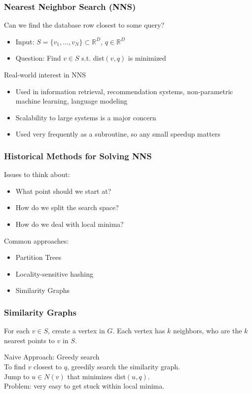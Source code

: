 \begin{frame}[t]
	\frametitle{Nearest Neighbor Search (NNS)}
		Can we find the database row closest to some query?
		\onslide<2-3> {
			\begin{itemize}
				\item Input: $S = \{v_1, \dots, v_N\} \subset \mathbb{R}^D$, $q \in \mathbb{R}^D$
				\item Question: Find $v \in S$ s.t. dist$(v, q)$ is minimized
			\end{itemize}
		}
		\vspace{5.0em}
		Real-world interest in NNS
		\onslide<3> {
			\begin{itemize}
				\item Used in information retrieval, recommendation systems, non-parametric machine learning, language modeling
				\item Scalability to large systems is a major concern
				\item Used very frequently as a subroutine, so any small speedup matters
			\end{itemize}
		}
\end{frame}

\begin{frame}[t]
	\frametitle{Historical Methods for Solving NNS}
	Issues to think about:
		\onslide<2-3> {
			\begin{itemize}
				\item What point should we start at?
				\item How do we split the search space?
				\item How do we deal with local minima?
			\end{itemize}
		}
		\vspace{5.0em}
		Common approaches:
		\onslide<3> {
			\begin{itemize}
				\item Partition Trees
				\item Locality-sensitive hashing
				\item Similarity Graphs
			\end{itemize}
		}
\end{frame}

\begin{frame}[t]
	\frametitle{Similarity Graphs}
	For each $v \in S$, create a vertex in $G$.
	Each vertex has $k$ neighbors, who are the $k$ nearest points to $v$ in $S$.

	\vspace{3.0em}
	 {
		Naive Approach: Greedy search\\
		To find $v$ closest to $q$, greedily search the similarity graph.\\
		Jump to $u \in N(v)$ that minimizes dist$(u,q)$.\\
		Problem: very easy to get stuck within local minima.
	}
\end{frame}


